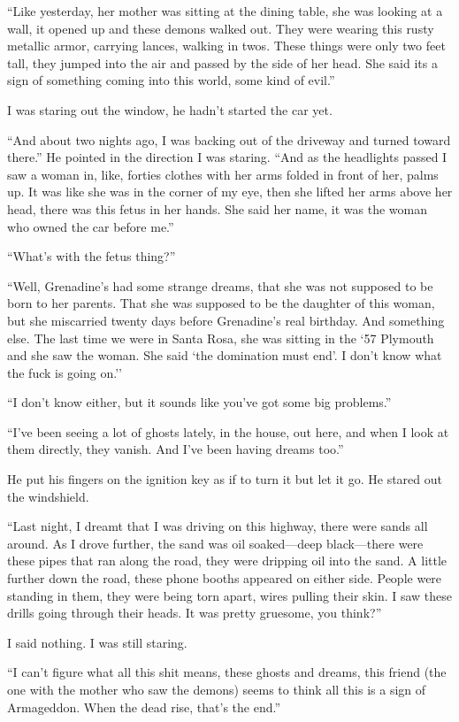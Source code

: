 ``Like yesterday, her mother was sitting at the dining table, she was
looking at a wall, it opened up and these demons walked out. They were
wearing this rusty metallic armor, carrying lances, walking in twos.
These things were only two feet tall, they jumped into the air and
passed by the side of her head. She said its a sign of something coming
into this world, some kind of evil.''

I was staring out the window, he hadn't started the car yet.

``And about two nights ago, I was backing out of the driveway and turned
toward there.'' He pointed in the direction I was staring. ``And as the
headlights passed I saw a woman in, like, forties clothes with her arms
folded in front of her, palms up. It was like she was in the corner of
my eye, then she lifted her arms above her head, there was this fetus in
her hands. She said her name, it was the woman who owned the car before
me.''

``What's with the fetus thing?''

``Well, Grenadine's had some strange dreams, that she was not supposed
to be born to her parents. That she was supposed to be the daughter of
this woman, but she miscarried twenty days before Grenadine's real
birthday. And something else. The last time we were in Santa Rosa, she
was sitting in the `57 Plymouth and she saw the woman. She said `the
domination must end'. I don't know what the fuck is going on.''

``I don't know either, but it sounds like you've got some big
problems.''

``I've been seeing a lot of ghosts lately, in the house, out here, and
when I look at them directly, they vanish. And I've been having dreams
too.''

He put his fingers on the ignition key as if to turn it but let it go.
He stared out the windshield.

``Last night, I dreamt that I was driving on this highway, there were
sands all around. As I drove further, the sand was oil soaked---deep
black---there were these pipes that ran along the road, they were
dripping oil into the sand. A little further down the road, these phone
booths appeared on either side. People were standing in them, they were
being torn apart, wires pulling their skin. I saw these drills going
through their heads. It was pretty gruesome, you think?''

I said nothing. I was still staring.

``I can't figure what all this shit means, these ghosts and dreams, this
friend (the one with the mother who saw the demons) seems to think all
this is a sign of Armageddon. When the dead rise, that's the end.''

